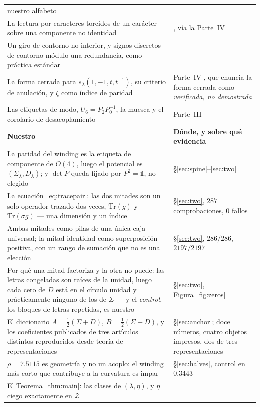 \documentclass[11pt,a4paper]{article}
\newcommand{\one}{\mathds{1}}
\newcommand{\Sig}{\Sigma_\lambda}
\newcommand{\Dl}{D_\lambda}
\begin{document}
\begin{longtable}{p{7.1cm} p{8.1cm}}
nuestro alfabeto\\
La lectura por caracteres torcidos de un carácter sobre una componente no identidad &
\cite{Jantzen,KLP}, vía la Parte~IV\\
Un giro de contorno no interior, y signos discretos de contorno módulo una redundancia, como práctica
estándar & \cite{Cstar}\\
La forma cerrada para $s_\lambda(1,-1,t,t^{-1})$, su criterio de anulación, y $\zeta$ como índice de
paridad & Parte~IV \cite{PartIV}, que enuncia la forma cerrada como \emph{verificada, no demostrada}\\
Las etiquetas de modo, $U_6=P_2P_0^{-1}$, la muesca y el corolario de desacoplamiento & Parte~III
\cite{PartIII}\\
\midrule
\rowcolor{okgreen!16}\textbf{Nuestro} & \textbf{Dónde, y sobre qué evidencia}\\
\midrule
La paridad del winding es la etiqueta de componente de $O(4)$, luego el potencial es $(\Sig,\Dl)$; y
$\det P$ queda fijado por $P^2=\one$, no elegido & \S\ref{sec:spine}--\ref{sec:two}\\
La ecuación~\eqref{eq:tracepair}: las dos mitades son un solo operador trazado dos veces,
$\mathrm{Tr}(g)$ y $\mathrm{Tr}(\sigma g)$ --- una dimensión y un índice & \S\ref{sec:two}, $287$
comprobaciones, $0$ fallos\\
Ambas mitades como pilas de una única caja universal; la mitad identidad como superposición positiva,
con un rango de sumación que no es una elección & \S\ref{sec:two}, $286/286$, $2197/2197$\\
Por qué una mitad factoriza y la otra no puede: las letras congeladas son raíces de la unidad, luego
cada cero de $D$ está en el círculo unidad y prácticamente ninguno de los de $\Sigma$ --- y el
\emph{control}, los bloques de letras repetidas, es nuestro & \S\ref{sec:two},
Figura~\ref{fig:zeros}\\
El diccionario $A=\tfrac12(\Sigma+D)$, $B=\tfrac12(\Sigma-D)$, y los coeficientes publicados de tres
artículos distintos reproducidos desde teoría de representaciones & \S\ref{sec:anchor}; \cite{AHMN}
doce números, \cite{HY} cuatro objetos impresos, \cite{HHHK} dos de tres representaciones\\
$\rho=7.5115$ es geometría y no un acoplo: el winding más corto que contribuye a la curvatura es
impar & \S\ref{sec:halves}, control en $0.3443$\\
El Teorema~\ref{thm:main}: las clases de $(\lambda,\eta)$, y $\eta$ ciego exactamente en $\mathcal Z$

\end{longtable}
\end{document}
